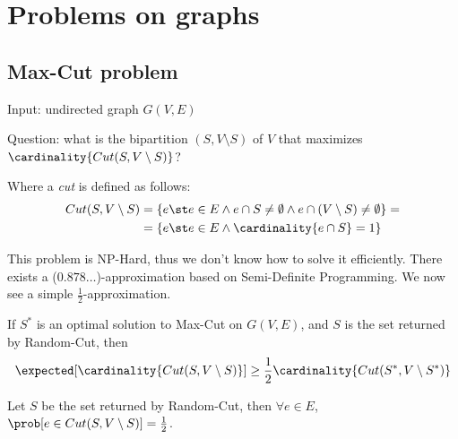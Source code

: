 \section{Problems on graphs}\label{sec:problems_graphs}

\def\cut{Cut(S, V \setminus S)}
\subsection{Max-Cut problem}\label{subsec:maxcut}
    Input: undirected graph $G(V,E)$

    Question: what is the bipartition $(S, V \setminus S)$ of $V$ that maximizes $\cardinality{\cut}$?

    Where a \textit{cut} is defined as follows:
    \begin{equation*}
        \begin{split}
            \cut &= \{ e \st e \in E \wedge e \cap S \neq \emptyset \wedge e \cap (V \setminus S) \neq \emptyset \} =\\
                &= \{ e \st e \in E \wedge \cardinality{e \cap S} = 1 \}            
        \end{split}
    \end{equation*}

    This problem is NP-Hard, thus we don't know how to solve it efficiently.
    There exists a ($0.878\dots$)-approximation based on Semi-Definite Programming. We now see a simple $\frac{1}{2}$-approximation.

    


    \begin{theorem}\label{thm:randcut_approx}
        If $S^*$ is an optimal solution to Max-Cut on $G(V,E)$, and $S$ is the set returned by Random-Cut, then
        \[ \expected[ \cardinality{\cut} ] \geq \frac{1}{2} \cardinality{Cut(S^*, V \setminus S^*)} \]
    \end{theorem}

    \begin{lemma}\label{lemma:randcut_1}
        Let $S$ be the set returned by Random-Cut, then $\forall e \in E$, $\prob[ e \in \cut] = \frac{1}{2}$.
    \end{lemma}

